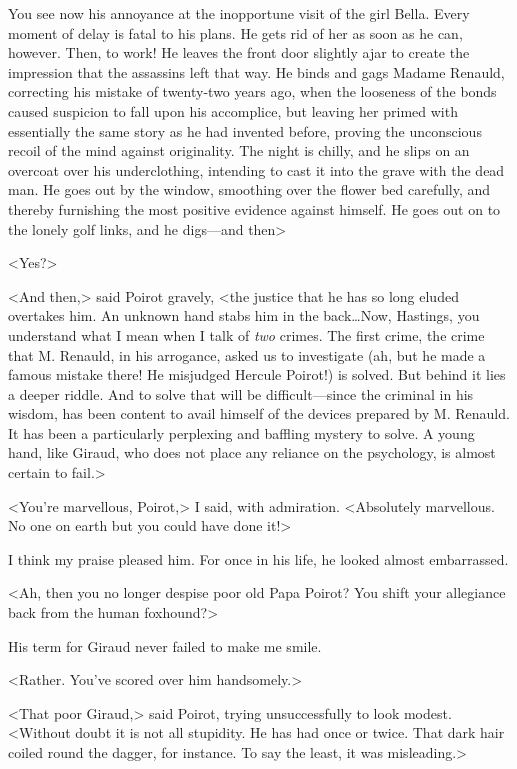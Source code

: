 You see now his annoyance at the inopportune visit of the girl Bella. Every moment of delay is fatal to his plans. He gets rid of her as soon as he can, however. Then, to work! He leaves the front door slightly ajar to create the impression that the assassins left that way. He binds and gags Madame Renauld, correcting his mistake of twenty-two years ago, when the looseness of the bonds caused suspicion to fall upon his accomplice, but leaving her primed with essentially the same story as he had invented before, proving the unconscious recoil of the mind against originality. The night is chilly, and he slips on an overcoat over his underclothing, intending to cast it into the grave with the dead man. He goes out by the window, smoothing over the flower bed carefully, and thereby furnishing the most positive evidence against himself. He goes out on to the lonely golf links, and he digs—and then\longdash> 

 <Yes?> 

 <And then,> said Poirot gravely, <the justice that he has so long eluded overtakes him. An unknown hand stabs him in the back\dots Now, Hastings, you understand what I mean when I talk of \emph{two} crimes. The first crime, the crime that M. Renauld, in his arrogance, asked us to investigate (ah, but he made a famous mistake there! He misjudged Hercule Poirot!) is solved. But behind it lies a deeper riddle. And to solve that will be difficult—since the criminal in his wisdom, has been content to avail himself of the devices prepared by M. Renauld. It has been a particularly perplexing and baffling mystery to solve. A young hand, like Giraud, who does not place any reliance on the psychology, is almost certain to fail.> 

 <You're marvellous, Poirot,> I said, with admiration. <Absolutely marvellous. No one on earth but you could have done it!> 

 I think my praise pleased him. For once in his life, he looked almost embarrassed. 

 <Ah, then you no longer despise poor old Papa Poirot? You shift your allegiance back from the human foxhound?> 

 His term for Giraud never failed to make me smile. 

 <Rather. You've scored over him handsomely.> 

 <That poor Giraud,> said Poirot, trying unsuccessfully to look modest. <Without doubt it is not all stupidity. He has had  once or twice. That dark hair coiled round the dagger, for instance. To say the least, it was misleading.> 

